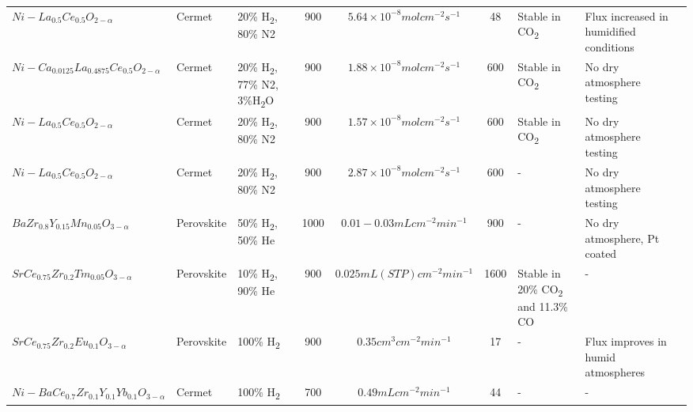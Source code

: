 \begin{longtable}{@{}C{5cm} C{2cm} C{4cm} ccc C{6cm} C{5cm} C{0.5cm} @{}}
\\ $Ni-La_{0.5}Ce_{0.5}O_{2-\alpha}$	
    & Cermet	
    & 20\% H\textsubscript{2}, 80\% N2	
    & 900	
    & $5.64 \times10^{-8} mol cm^{-2} s^{-1}$	
    & 48	
    & Stable in CO\textsubscript{2}	
    & Flux increased in humidified conditions	
    & \cite{Zhu2015}

\\ $Ni-Ca_{0.0125}La_{0.4875}Ce_{0.5}O_{2-\alpha}$	
    & Cermet	
    & 20\% H\textsubscript{2}, 77\% N2, 3\%H\textsubscript{2}O	
    & 900	
    & $1.88 \times 10^{-8} mol cm^{-2} s^{-1}	$
    & 600	
    & Stable in CO\textsubscript{2}	
    & No dry atmosphere testing	
    & \cite{Fang2010}

\\ $Ni-La_{0.5}Ce_{0.5}O_{2-\alpha}$	
    & Cermet	
    & 20\% H\textsubscript{2}, 80\% N2	
    & 900	
    & $1.57 \times 10^{-8} mol cm^{-2} s^{-1}$	
    & 600	
    & Stable in CO\textsubscript{2}	
    & No dry atmosphere testing	
    & \cite{Fang2010}

\\ $Ni-La_{0.5}Ce_{0.5}O_{2-\alpha}$	
    & Cermet	
    & 20\% H\textsubscript{2}, 80\% N2	
    & 900	
    & $2.87 \times 10^{-8} mol cm^{-2} s^{-1}$	
    & 600	
    & -	
    & No dry atmosphere testing	
    & \cite{Yan2010}

\\ $BaZr_{0.8}Y_{0.15}Mn_{0.05}O_{3-\alpha}$	
    & Perovskite	
    & 50\% H\textsubscript{2}, 50\% He	
    & 1000	
    & $0.01 - 0.03 mL cm^{-2} min^{-1}$	
    & 900	
    & -	
    & No dry atmosphere, Pt coated	
    & \cite{Escolastico2012}

\\ $SrCe_{0.75}Zr_{0.2}Tm_{0.05}O_{3-\alpha}$	
    & Perovskite	
    & 10\% H\textsubscript{2}, 90\% He
    & 900	
    & $0.025 mL(STP) cm^{-2} min^{-1}$	
    & 1600	
    & Stable in 20\% CO\textsubscript{2} and 11.3\% CO	
    & -	
    & \cite{Kniep2010}

\\ $SrCe_{0.75}Zr_{0.2}Eu_{0.1}O_{3-\alpha}$	
    & Perovskite	
    & 100\% H\textsubscript{2}	
    & 900	
    & $0.35 cm^3 cm^{-2} min^{-1}$	
    & 17	
    & -	
    & Flux improves in humid atmospheres	
    & \cite{O2009}

\\ $Ni - BaCe_{0.7}Zr_{0.1}Y_{0.1}Yb_{0.1}O_{3-\alpha}$	
    & Cermet	
    & 100\% H\textsubscript{2}	
    & 700	
    & $0.49 mL cm^{-2} min^{-1}$	
    & 44	
    & -	
    & -	
    & \cite{Liu2013}


\end{longtable}
